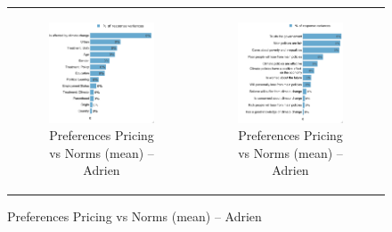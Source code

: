\documentclass{article}
\begin{document}
\begin{figure}[h!]
\begin{center}
	\begin{tabular}{cc}
		\begin{subfigure}{0.5\textwidth}
		\caption{Preferences Pricing vs Norms (mean) -- Adrien}
			\includegraphics[width=\textwidth]{lmg_pref_pricing_norms_mean_socio_non_standardized}
		\end{subfigure}&
		\begin{subfigure}{0.5\textwidth}
		\caption{Preferences Pricing vs Norms (mean) -- Adrien}
			\includegraphics[width=\textwidth]{lmg_pref_pricing_norms_mean_indices_non_standardized}
		\end{subfigure}\\
	\end{tabular}
\end{center}
\end{figure}
\end{document}
